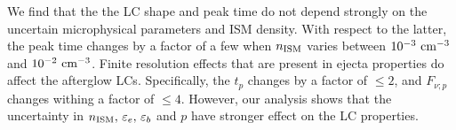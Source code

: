 We find that the the \ac{LC} shape and peak time do not depend strongly on the 
uncertain microphysical parameters and \ac{ISM} density. With respect to the latter, 
the peak time changes by a factor of a few when $n_{\text{ISM}}$ varies between 
$10^{-3}\, \,\text{cm}^{-3}$ and $10^{-2}\,\,\text{cm}^{-3}$.
Finite resolution effects that are present in ejecta properties do affect the 
afterglow \acp{LC}. Specifically, the $t_p$ changes by a factor of 
${\leq2}$, and $F_{\nu;p}$ changes withing a factor of ${\leq4}$. However, 
our analysis shows that the uncertainty in $n_{\text{ISM}},\,\varepsilon_e,\,\varepsilon_b$ 
and $p$ have stronger effect on the \ac{LC} properties. 

%

